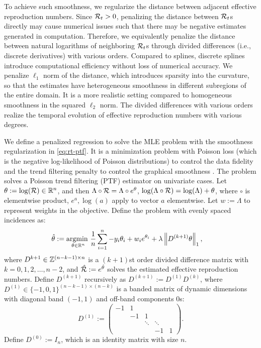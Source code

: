 To achieve such smoothness, we regularize the distance between adjacent effective reproduction numbers. Since $\mathcal{R}_t > 0$, penalizing the distance between $\mathcal{R}_t$s directly may cause numerical issues such that there may be negative estimates generated in computation. Therefore, we equivalently penalize the distance between natural logarithms of neighboring $\mathcal{R}_t$s through divided differences (i.e., discrete derivatives) with various orders.  
Compared to splines, discrete splines introduce computational efficiency without loss of numerical accuracy. 
We penalize $\ell_1$ norm of the distance, which introduces sparsity into the curvature, so that the estimates have heterogeneous smoothness in different subregions of the entire domain. It is a more realistic setting compared to homogeneous smoothness in the squared $\ell_2$ norm. 
The divided differences with various orders realize the temporal evolution of effective reproduction numbers with various degrees. 

We define a penalized regression to solve the MLE problem with the smoothness regularization in \eqref{eq:rt-ptf}. It is a minimization problem with Poisson loss (which is the negative log-likelihood of Poisson distributions) to control the data fidelity and the trend filtering penalty to control the graphical smoothness \citep{kim2009ell_1,tibshirani2014adaptive,tibshirani2022divided}. The problem solves a Poisson trend filtering (PTF) estimator on univariate cases. 
Let $\theta := \log(\mathcal{R}) \in \mathbb{R}^n$, and then $\Lambda\circ \mathcal{R} = \Lambda\circ e^{\theta}$, $\log(\Lambda\circ \mathcal{R}) = \log(\Lambda) + \theta$, where $\circ$ is elementwise product, $e^{a}, \log(a)$ apply to vector $a$ elementwise. Let $w:=\Lambda$ to represent weights in the objective. Define the problem with evenly spaced incidences as: 
\begin{equation} \label{eq:rt-ptf}
    \begin{split}
        \hat{\theta} &:= \underset{\theta\in\mathbb{R}^n}{\operatorname*{argmin}\ } \frac{1}{n}\sum_{i=1}^n -y_i \theta_i + w_i e^{\theta_i} + \lambda \left\lVert D^{(k+1)} \theta \right\rVert_1,         
    \end{split}
\end{equation}
where $D^{k+1} \in \mathbb{Z}^{(n-k-1)\times n}$ is a $(k+1)$st order divided difference matrix with $k = 0,1,2,\dots, n-2$, and $\hat{\mathcal{R}} := e^{\hat{\theta}}$ solves the estimated effective reproduction numbers. Define $D^{(k+1)}$ recursively as $D^{(k+1)} := D^{(1)} D^{(k)}$, where $D^{(1)} \in \{-1,0,1\}^{(n-k-1)\times (n-k)}$ is a banded matrix of dynamic dimensions with diagonal band $(-1,1)$ and off-band components $0$s: 
$$D^{(1)} := 
\begin{pmatrix}
-1 & 1 &  & & \\
 & -1 & 1 & & \\
 & & \ddots & \ddots & \\
 & & & -1 & 1
\end{pmatrix}.
$$ 
Define $D^{(0)} := I_n$, which is an identity matrix with size $n$. %

